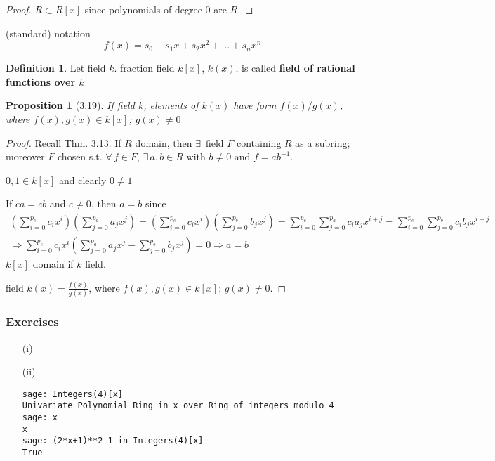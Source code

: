 \documentclass[twoside,landscape]{amsart}
\theoremstyle{plain}
\newtheorem{proposition}{Proposition}
\theoremstyle{definition}
\newtheorem{definition}{Definition}
\theoremstyle{remark}
\newcommand{\exercisehead}[1]
  { \smallskip
   \noindent{\small\bf Exercise #1.}
  }
\begin{document}
\begin{multicols*}{2}
\begin{proof}
$R \subset R[x]$ since polynomials of degree $0$ are $R$.  


\end{proof}

(standard) notation
\[
f(x) = s_0 + s_1 x + s_2 x^2 + \dots + s_n x^n
\]

\begin{definition}
  Let field $k$.  fraction field $k[x]$, $k(x)$, is called \textbf{field of rational functions over $k$}
  \end{definition}

\begin{proposition}[3.19]
  If field $k$, elements of $k(x)$ have form $f(x)/g(x)$, where $f(x),g(x) \in k[x]$; $g(x) \neq 0$
  \end{proposition}

\begin{proof}
  Recall Thm. 3.13.  If $R$ domain, then $\exists \, $ field $F$ containing $R$ as a subring; moreover $F$ chosen s.t. $\forall \, f \in F$, $\exists \, a,b \in R$ with $b\neq 0$ and $f=ab^{-1}$.

  $0,1 \in k[x]$ and clearly $0\neq 1$

  If $ca=cb$ and $c\neq 0$, then $a=b$ since
  \[
\begin{gathered}
  \left( \sum_{i=0}^{p_c} c_ix^i \right) \left( \sum_{j=0}^{p_a} a_jx^j \right) = \left( \sum_{i=0}^{p_c} c_ix^i \right) \left( \sum_{j=0}^{p_b} b_j x^j \right) = \sum_{i=0}^{p_c} \sum_{j=0}^{p_a} c_i a_jx^{i+j} = \sum_{i=0}^{p_c} \sum_{j=0}^{p_b} c_ib_j x^{i+j} \\
 \Longrightarrow \sum_{i=0}^{p_c} c_ix^i \left( \sum_{j=0}^{p_a} a_jx^j - \sum_{j=0}^{p_b} b_jx^j \right) = 0 \Longrightarrow a=b
  \end{gathered}
\]
$k[x]$ domain if $k$ field.  

field $k(x) = \frac{f(x)}{g(x)}$, where $f(x),g(x) \in k[x]$; $g(x)\neq 0$.  
  \end{proof}

\subsubsection*{Exercises}

\exercisehead{3.21}

\begin{enumerate}
\item[(i)]
\item[(ii)] 
\begin{lstlisting}
sage: Integers(4)[x]
Univariate Polynomial Ring in x over Ring of integers modulo 4
sage: x
x
sage: (2*x+1)**2-1 in Integers(4)[x]
True
\end{lstlisting}
\end{enumerate}



\end{multicols*}
\end{document}
